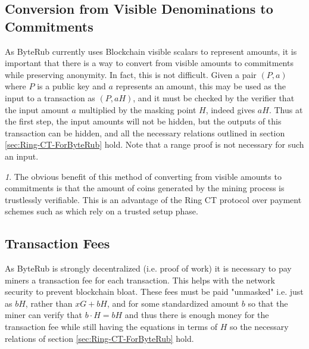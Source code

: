 \documentclass[12pt,oneside,english]{amsart}
\numberwithin{equation}{section}
\numberwithin{figure}{section}
\theoremstyle{plain}
\theoremstyle{plain}
\theoremstyle{remark}
\newtheorem{rem}[thm]{\protect\remarkname}
\theoremstyle{plain}
\theoremstyle{remark}
\theoremstyle{remark}
\theoremstyle{plain}
\theoremstyle{definition}
\providecommand{\remarkname}{Remark}
\begin{document}
\subsection{Conversion from Visible Denominations to Commitments}
\label{conversion}

As ByteRub currently uses Blockchain visible scalars to represent amounts, it is important that there is a way to convert from visible amounts to commitments while preserving anonymity. In fact, this is not difficult. Given a pair $(P, a)$ where $P$ is a public key and $a$ represents an amount, this may be used as the input to a transaction as $(P, aH)$, and it must be checked by the verifier that the input amount $a$ multiplied by the masking point $H$, indeed gives $aH$. Thus at the first step, the input amounts will not be hidden, but the outputs of this transaction can be hidden, and all the necessary relations outlined in section \ref{sec:Ring-CT-ForByteRub} hold. Note that a range proof is not necessary for such an input.
\begin{rem}
The obvious benefit of this method of converting from visible amounts to commitments is that the amount of coins generated by the mining process is trustlessly verifiable. This is an advantage of the Ring CT protocol over payment schemes such as \cite{Z} which rely on a trusted setup phase. 
\end{rem}
\subsection{Transaction Fees}
As ByteRub is strongly decentralized (i.e. proof of work) it is necessary to pay miners a transaction fee for each transaction. This helps with the network security to prevent blockchain bloat. These fees must be paid "unmasked" i.e. just as $bH$, rather than $xG+bH$, and for some standardized amount $b$ so that the miner can verify that $b\cdot H = bH$ and thus there is enough money for the transaction fee while still having the equations in terms of $H$ so the necessary relations of section \ref{sec:Ring-CT-ForByteRub} hold. 
\end{document}
